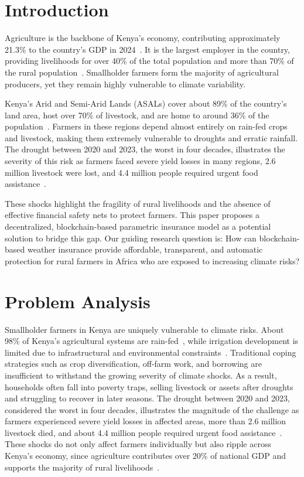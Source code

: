 \documentclass[11pt,a4paper]{article}
\begin{document}
    \section{Introduction}\label{sec:intro}
    Agriculture is the backbone of Kenya's economy, contributing approximately 21.3\% to the country's GDP in 2024~\parencite{WorldBank2024}.
    It is the largest employer in the country, providing livelihoods for over 40\% of the total population and more than 70\% of the rural population~\parencite{FAO2024}.
    Smallholder farmers form the majority of agricultural producers, yet they remain highly vulnerable to climate variability.

    Kenya's Arid and Semi-Arid Lands (ASALs) cover about 89\% of the country's land area, host over 70\% of livestock, and are home to around 36\% of the population~\parencite{IUCN, NDMA2021, UNEP-DHI}.
    Farmers in these regions depend almost entirely on rain-fed crops and livestock, making them extremely vulnerable to droughts and erratic rainfall.
    The drought between 2020 and 2023, the worst in four decades, illustrates the severity of this risk as farmers faced severe yield losses in many regions, 2.6 million livestock were lost, and 4.4 million people required urgent food assistance~\parencite{TheStar2024, NationalDroughtManagementAuthority2024}.

    These shocks highlight the fragility of rural livelihoods and the absence of effective financial safety nets to protect farmers.
    This paper proposes a decentralized, blockchain-based parametric insurance model as a potential solution to bridge this gap.
    Our guiding research question is: How can blockchain-based weather insurance provide affordable, transparent, and automatic protection for rural farmers in Africa who are exposed to increasing climate risks?

    \section{Problem Analysis}\label{sec:problem}
    Smallholder farmers in Kenya are uniquely vulnerable to climate risks.
    About 98\% of Kenya's agricultural systems are rain-fed~\parencite{GovernmentOfKenya2017}, while irrigation development is limited due to infrastructural and environmental constraints~\parencite{Wairimu}.
    Traditional coping strategies such as crop diversification, off-farm work, and borrowing are insufficient to withstand the growing severity of climate shocks.
    As a result, households often fall into poverty traps, selling livestock or assets after droughts and struggling to recover in later seasons.
    The drought between 2020 and 2023, considered the worst in four decades, illustrates the magnitude of the challenge as farmers experienced severe yield losses in affected areas, more than 2.6 million livestock died, and about 4.4 million people required urgent food assistance~\parencite{OCHA2023}.
    These shocks do not only affect farmers individually but also ripple across Kenya's economy, since agriculture contributes over 20\% of national GDP and supports the majority of rural livelihoods~\parencite{WorldBank2024}.
\end{document}
